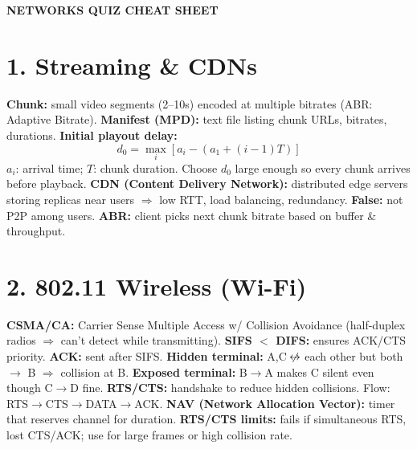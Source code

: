 \documentclass[10pt]{article}
\begin{document}
\small
\begin{multicols*}{2}
\raggedright

\textbf{\Large NETWORKS QUIZ CHEAT SHEET}\\[-2pt]
\hrulefill

\section*{1. Streaming \& CDNs}
\textbf{Chunk:} small video segments (2–10s) encoded at multiple bitrates (ABR: Adaptive Bitrate).  
\textbf{Manifest (MPD):} text file listing chunk URLs, bitrates, durations.  
\textbf{Initial playout delay:}
\[
d_0 = \max_i [a_i - (a_1 + (i-1)T)]
\]
$a_i$: arrival time; $T$: chunk duration. Choose $d_0$ large enough so every chunk arrives before playback.  
\textbf{CDN (Content Delivery Network):} distributed edge servers storing replicas near users $\Rightarrow$ low RTT, load balancing, redundancy.  
\textbf{False:} not P2P among users.  
\textbf{ABR:} client picks next chunk bitrate based on buffer \& throughput.

\section*{2. 802.11 Wireless (Wi-Fi)}
\textbf{CSMA/CA:} Carrier Sense Multiple Access w/ Collision Avoidance (half-duplex radios $\Rightarrow$ can’t detect while transmitting).  
\textbf{SIFS $<$ DIFS:} ensures ACK/CTS priority.  
\textbf{ACK:} sent after SIFS.  
\textbf{Hidden terminal:} A,C $\not\!\leftrightarrow$ each other but both $\to$ B $\Rightarrow$ collision at B.  
\textbf{Exposed terminal:} B$\to$A makes C silent even though C$\to$D fine.  
\textbf{RTS/CTS:} handshake to reduce hidden collisions.  
Flow: RTS$\to$CTS$\to$DATA$\to$ACK.  
\textbf{NAV (Network Allocation Vector):} timer that reserves channel for duration.  
\textbf{RTS/CTS limits:} fails if simultaneous RTS, lost CTS/ACK; use for large frames or high collision rate.


\end{multicols*}
\end{document}
